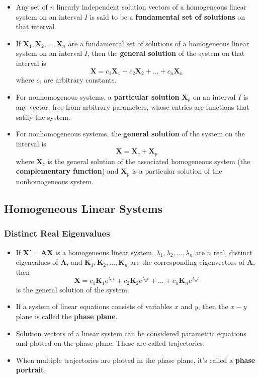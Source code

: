 \documentclass{article}
\begin{document}
\begin{itemize}
  \item Any set of $n$ linearly independent solution vectors of a homogeneous linear system on an interval $I$ is said to be a \textbf{fundamental set of solutions} on that interval.

  \item If $\mathbf{X}_1, \mathbf{X}_2, \ldots, \mathbf{X}_n$ are a fundamental set of solutions of a homogeneous linear system on an interval $I$, then the \textbf{general solution} of the system on that interval is \[\mathbf{X} = c_1 \mathbf{X}_1 + c_2 \mathbf{X}_2 + \ldots + c_n \mathbf{X}_n\] where $c_i$ are arbitrary constants.

  \item For nonhomogenous systems, a \textbf{particular solution} $\mathbf{X}_p$ on an interval $I$ is any vector, free from arbitrary parameters, whose entries are functions that satify the system.

  \item For nonhomogeneous systems, the \textbf{general solution} of the system on the interval is \[\mathbf{X} = \mathbf{X}_c + \mathbf{X}_p\] where $\mathbf{X}_c$ is the general solution of the associated homogeneous system (the \textbf{complementary function}) and $\mathbf{X}_p$ is a particular solution of the nonhomogeneous system.
\end{itemize}

\subsection{Homogeneous Linear Systems}

\subsubsection{Distinct Real Eigenvalues}

\begin{itemize}
  \item If $\mathbf{X}' = \mathbf{A} \mathbf{X}$ is a homogeneous linear system, $\lambda_1, \lambda_2, \ldots, \lambda_n$ are $n$ real, distinct eigenvalues of $\mathbf{A}$, and $\mathbf{K}_1, \mathbf{K}_2, \ldots, \mathbf{K}_n$ are the corresponding eigenvectors of $\mathbf{A}$, then \[\mathbf{X} = c_1 \mathbf{K}_1 e^{\lambda_1 t} + c_2 \mathbf{K}_2 e^{\lambda_2 t} + \ldots + c_n \mathbf{K}_n e^{\lambda_n t}\] is the general solution of the system.

  \item If a system of linear equations consists of variables $x$ and $y$, then the $x-y$ plane is called the \textbf{phase plane}.

  \item Solution vectors of a linear system can be considered parametric equations and plotted on the phase plane. These are called trajectories.

  \item When multiple trajectories are plotted in the phase plane, it's called a \textbf{phase portrait}.
\end{itemize}
\end{document}
